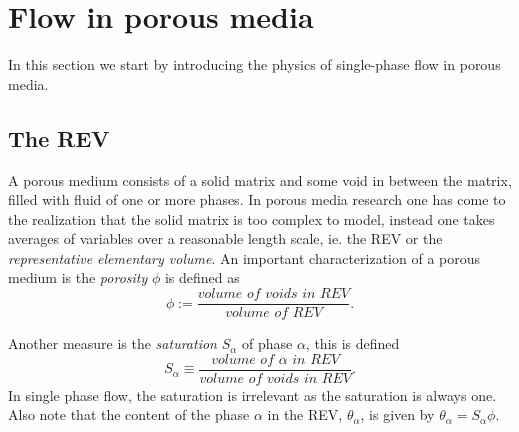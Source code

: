 \documentclass[../Main/main.tex]{subfiles}
\begin{document}
\graphicspath{{../Flow in porous media/figs/}}
\chapter{Flow in porous media}




In this section we start by introducing the physics of single-phase flow in porous media.




\section*{The REV}\label{REV}
A porous medium consists of a solid matrix and some void in between the matrix, filled with fluid of one or more phases. In porous media research one has come to the realization that the solid matrix is too complex to model, instead one takes averages of variables over a reasonable length scale, ie. the REV or the \emph{representative elementary volume}.
An important characterization of a porous medium is the \emph{porosity} $\phi$ is defined as 
\begin{equation}
	\phi := \frac{\textit{volume of voids in REV}}{\textit{volume of REV}}.
\end{equation}

Another measure is the \emph{saturation} $S_{\alpha}$ of phase $\alpha$,  this is defined 
\begin{equation}
	S_{\alpha} \equiv \frac{\textit{volume of }\alpha \textit{ in REV}}{\textit{volume of voids in REV}}.
\end{equation}
In single phase flow, the saturation is irrelevant as the saturation is always one. Also note that the content of the phase $\alpha$ in the REV, $\theta_{\alpha}$, is given by $\theta_{\alpha} = S_{\alpha} \phi$.
\end{document}

